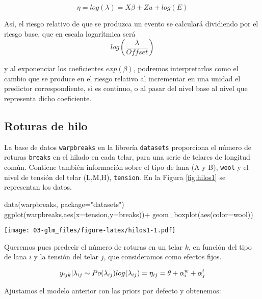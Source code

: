 \documentclass[
]{book}
\newenvironment{Shaded}{\begin{snugshade}}{\end{snugshade}}
\newcommand{\AttributeTok}[1]{\textcolor[rgb]{0.77,0.63,0.00}{#1}}
\newcommand{\FunctionTok}[1]{\textcolor[rgb]{0.00,0.00,0.00}{#1}}
\newcommand{\NormalTok}[1]{#1}
\newcommand{\SpecialCharTok}[1]{\textcolor[rgb]{0.00,0.00,0.00}{#1}}
\newcommand{\StringTok}[1]{\textcolor[rgb]{0.31,0.60,0.02}{#1}}
\begin{document}
\[\eta=log(\lambda)=X\beta+Zu+log(E)\]

Así, el riesgo relativo de que se produzca un evento se calculará dividiendo por el riesgo base, que en escala logarítmica será
\[log\left(\frac{\lambda}{Offset}\right)\]

y al exponenciar los coeficientes \(exp(\beta)\), podremos interpretarlos como el cambio que se produce en el riesgo relativo al incrementar en una unidad el predictor correspondiente, si es continuo, o al pasar del nivel base al nivel que representa dicho coeficiente.

\hypertarget{roturas-de-hilo}{%
\subsection{Roturas de hilo}\label{roturas-de-hilo}}

La base de datos \texttt{warpbreaks} en la librería \texttt{datasets} proporciona el número de roturas \texttt{breaks} en el hilado en cada telar, para una serie de telares de longitud común. Contiene también información sobre el tipo de lana (A y B), \texttt{wool} y el nivel de tensión del telar (L,M,H), \texttt{tension}. En la Figura \ref{fig:hilos1} se representan los datos.

\begin{Shaded}
\begin{Highlighting}[]
\FunctionTok{data}\NormalTok{(warpbreaks, }\AttributeTok{package=}\StringTok{"datasets"}\NormalTok{)}
\FunctionTok{ggplot}\NormalTok{(warpbreaks,}\FunctionTok{aes}\NormalTok{(}\AttributeTok{x=}\NormalTok{tension,}\AttributeTok{y=}\NormalTok{breaks))}\SpecialCharTok{+}
  \FunctionTok{geom\_boxplot}\NormalTok{(}\FunctionTok{aes}\NormalTok{(}\AttributeTok{color=}\NormalTok{wool))}
\end{Highlighting}
\end{Shaded}

\texttt{[image: 03-glm\_files/figure-latex/hilos1-1.pdf]}

Queremos pues predecir el número de roturas en un telar \(k\), en función del tipo de lana \(i\) y la tensión del telar \(j\), que consideramos como efectos fijos.

\[ y_{ijk}|\lambda_{ij} \sim Po(\lambda_{ij}) \\
log(\lambda_{ij})=\eta_{ij}=\theta+ \alpha_i^w+ \alpha_j^t\]

Ajustamos el modelo anterior con las priors por defecto y obtenemos:
\end{document}
